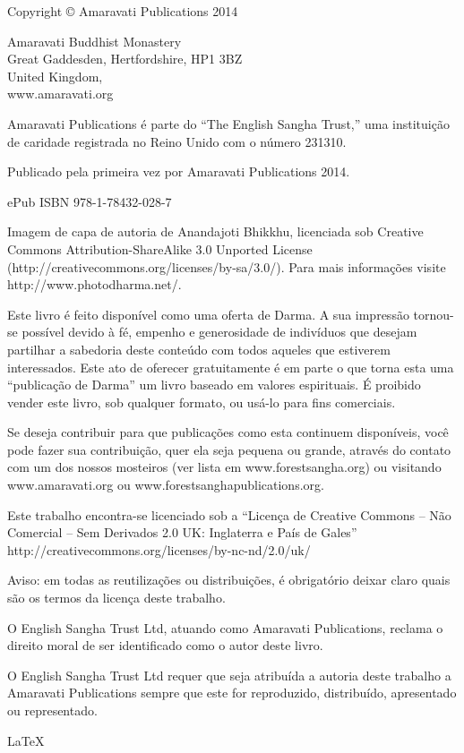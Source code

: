 
\cleartorecto

Copyright © Amaravati Publications 2014

Amaravati Buddhist Monastery\\
Great Gaddesden, Hertfordshire, HP1 3BZ\\
United Kingdom,\\
www.amaravati.org

Amaravati Publications é parte do “The English Sangha Trust,” uma
instituição de caridade registrada no Reino Unido com o número 231310.

Publicado pela primeira vez por Amaravati Publications 2014.

ePub ISBN 978-1-78432-028-7

Imagem de capa de autoria de Anandajoti Bhikkhu, licenciada sob Creative
Commons Attribution-ShareAlike 3.0 Unported License
(http://creativecommons.org/licenses/by-sa/3.0/). Para mais informações
visite http://www.photodharma.net/. 

Este livro é feito disponível como uma oferta de Darma. A sua impressão
tornou-se possível devido à fé, empenho e generosidade de indivíduos
que desejam partilhar a sabedoria deste conteúdo com todos aqueles que
estiverem interessados. Este ato de oferecer gratuitamente é em parte o
que torna esta uma “publicação de Darma” um livro baseado em valores
espirituais. É proibido vender este livro, sob qualquer formato, ou
usá-lo para fins comerciais.

Se deseja contribuir para que publicações como esta continuem
disponíveis, você pode fazer sua contribuição, quer ela seja pequena ou
grande, através do contato com um dos nossos mosteiros (ver lista em
www.forestsangha.org) ou visitando www.amaravati.org ou
www.forestsanghapublications.org.

Este trabalho encontra-se licenciado sob a “Licença de Creative Commons
-- Não Comercial -- Sem Derivados 2.0 UK: Inglaterra e País de Gales”
http://creativecommons.org/licenses/by-nc-nd/2.0/uk/

Aviso: em todas as reutilizações ou distribuições, é obrigatório deixar
claro quais são os termos da licença deste trabalho.

O English Sangha Trust Ltd, atuando como Amaravati Publications, reclama
o direito moral de ser identificado como o autor deste livro.

O English Sangha Trust Ltd requer que seja atribuída a autoria deste
trabalho a Amaravati Publications sempre que este for reproduzido,
distribuído, apresentado ou representado.

\LaTeX

